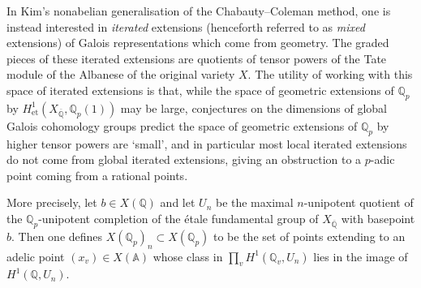 \documentclass[11pt]{amsart}
\def\Q{\mathbb Q}
\theoremstyle{plain}
\theoremstyle{definition}
\newcommand{\et}{\mathrm{et}}
\begin{document}
In Kim's nonabelian generalisation of the Chabauty--Coleman method, one is instead interested in \textit{iterated} extensions (henceforth referred to as \textit{mixed} extensions) of Galois representations which come from geometry. The graded pieces of these iterated extensions are quotients of tensor powers of the Tate module of the Albanese of the original variety $X$. The utility of working with this space of iterated extensions is that, while the space of geometric extensions of $\Q _p $ by $H^1 _{\et }(X_{\overline{\Q }},\Q _p (1))$ may be large, conjectures on the dimensions of global Galois cohomology groups predict the space of geometric extensions of $\Q _p $ by higher tensor powers are `small', and in particular most local iterated extensions do not come from global iterated extensions, giving an obstruction to a $p$-adic point coming from a rational points.

More precisely, let $b\in X(\Q )$ and let $U_n $ be the maximal $n$-unipotent quotient of the $\Q _p $-unipotent completion of the \'etale fundamental group of $X_{\overline{\Q }}$ with basepoint $b$. Then one defines $X(\Q _p )_n \subset X(\Q _p )$ to be the set of points extending to an adelic point $(x_v )\in X(\mathbb{A})$ whose class in $\prod _v H^1 (\Q _v ,U_n )$ lies in the image of $H^1 (\Q ,U_n )$.
\end{document}
